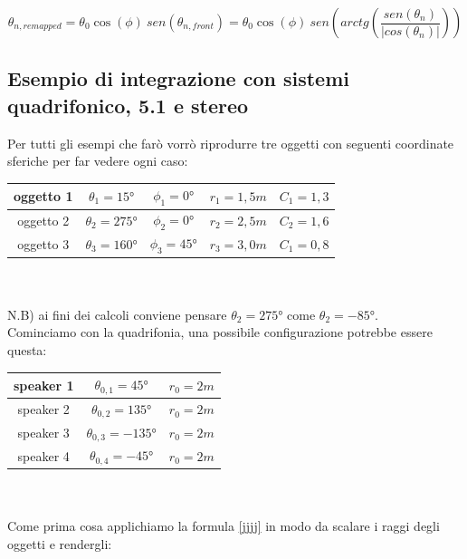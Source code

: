 \documentclass[12pt,a4paper]{report}
\begin{document}
\begin{equation}
\theta_{n, remapped}= \theta_0 \cos(\phi) \ sen (\theta_{n,front}) = \theta_0 \cos(\phi)\ sen \left( arctg  \left( \dfrac{sen(\theta_n)}{\vert cos(\theta_n)\vert } \right)\right)
\label{mmmm}
\end{equation}





\subsection{Esempio di integrazione con sistemi quadrifonico, 5.1 e stereo}

Per tutti gli esempi che farò vorrò riprodurre tre oggetti con seguenti coordinate sferiche per far vedere ogni caso:\\

\begin{tabular}{|c|c|c|c|c|}
\hline
oggetto 1 & $\theta_1=15°$ & $\phi_1=0°$ & $r_1=1,5m$ & $C_1=1,3$ \\
\hline
oggetto 2 & $\theta_2=275°$ & $\phi_2=0°$ & $r_2=2,5m$ & $C_2=1,6$ \\
\hline
oggetto 3 & $\theta_3=160°$ & $\phi_3=45°$ & $r_3=3,0m$ & $C_1=0,8$ \\
\hline

\end{tabular} \\ \\

N.B) ai fini dei calcoli conviene pensare $\theta_2=275°$ come $\theta_2=-85°$.\\

Cominciamo con la quadrifonia, una possibile configurazione potrebbe essere questa:\\

\begin{tabular}{|c|c|c|}
\hline
speaker 1 & $\theta_{0,1}=45°$ & $r_0=2m$\\
\hline
speaker 2 & $\theta_{0,2}=135°$ & $r_0=2m$\\
\hline
speaker 3 & $\theta_{0,3}=-135°$ & $r_0=2m$\\
\hline
speaker 4 & $\theta_{0,4}=-45°$ & $r_0=2m$\\
\hline
\end{tabular} \\
\\

Come prima cosa applichiamo la formula \ref{jjjj} in modo da scalare i raggi degli oggetti e rendergli:
\end{document}
